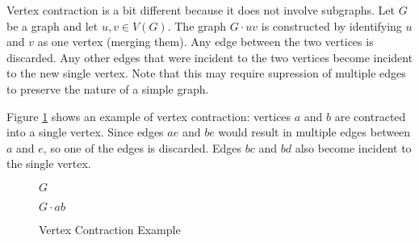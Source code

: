 Vertex contraction is a bit different because it does not involve subgraphs.  Let \(G\) be a graph and let \(u,v\in
V(G)\).  The graph \(G\cdot uv\) is constructed by identifying \(u\) and \(v\) as one vertex (merging them).  Any
edge between the two vertices is discarded.  Any other edges that were incident to the two vertices become incident
to the new single vertex.  Note that this may require supression of multiple edges to preserve the nature of a
simple graph.

Figure \ref{fig:contract} shows an example of vertex contraction: vertices \(a\) and \(b\) are contracted into a
single vertex.  Since edges \(ae\) and \(be\) would result in multiple edges between \(a\) and \(e\), so one of the
edges is discarded.  Edges \(bc\) and \(bd\) also become incident to the single vertex.

\begin{figure}[h]
  \label{fig:contract}
  \begin{minipage}{3in}
    \begin{center}

      \bigskip

      \(G\)
    \end{center}
  \end{minipage}
  \begin{minipage}{3in}
    \begin{center} 

      \bigskip

      \(G\cdot ab\)
    \end{center}
  \end{minipage}
  \caption{Vertex Contraction Example}
\end{figure}

